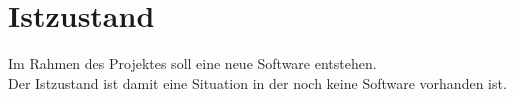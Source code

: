 
\chapter{Istzustand}
Im Rahmen des Projektes soll eine neue Software entstehen. \\
Der Istzustand ist damit eine Situation in der noch keine Software vorhanden ist.